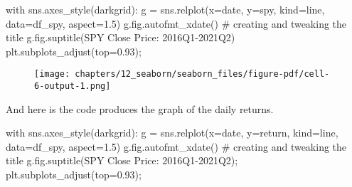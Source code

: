 \documentclass[
  letterpaper,
  DIV=11,
  numbers=noendperiod]{scrreprt}
\newenvironment{Shaded}{\begin{snugshade}}{\end{snugshade}}
\newcommand{\CommentTok}[1]{\textcolor[rgb]{0.37,0.37,0.37}{#1}}
\newcommand{\ControlFlowTok}[1]{\textcolor[rgb]{0.00,0.23,0.31}{#1}}
\newcommand{\FloatTok}[1]{\textcolor[rgb]{0.68,0.00,0.00}{#1}}
\newcommand{\NormalTok}[1]{\textcolor[rgb]{0.00,0.23,0.31}{#1}}
\newcommand{\OperatorTok}[1]{\textcolor[rgb]{0.37,0.37,0.37}{#1}}
\newcommand{\StringTok}[1]{\textcolor[rgb]{0.13,0.47,0.30}{#1}}
\begin{document}
\begin{Shaded}
\begin{Highlighting}[]
\ControlFlowTok{with}\NormalTok{ sns.axes\_style(}\StringTok{\textquotesingle{}darkgrid\textquotesingle{}}\NormalTok{):}
\NormalTok{    g }\OperatorTok{=}\NormalTok{ sns.relplot(x}\OperatorTok{=}\StringTok{\textquotesingle{}date\textquotesingle{}}\NormalTok{, y}\OperatorTok{=}\StringTok{\textquotesingle{}spy\textquotesingle{}}\NormalTok{, kind}\OperatorTok{=}\StringTok{\textquotesingle{}line\textquotesingle{}}\NormalTok{, data}\OperatorTok{=}\NormalTok{df\_spy, aspect}\OperatorTok{=}\FloatTok{1.5}\NormalTok{)}
\NormalTok{    g.fig.autofmt\_xdate()}
    \CommentTok{\# creating and tweaking the title}
\NormalTok{    g.fig.suptitle(}\StringTok{\textquotesingle{}SPY Close Price: 2016Q1{-}2021Q2\textquotesingle{}}\NormalTok{)}
\NormalTok{    plt.subplots\_adjust(top}\OperatorTok{=}\FloatTok{0.93}\NormalTok{)}\OperatorTok{;}
\end{Highlighting}
\end{Shaded}

\begin{figure}[H]

{\centering \texttt{[image: chapters/12\_seaborn/seaborn\_files/figure-pdf/cell-6-output-1.png]}

}

\end{figure}

And here is the code produces the graph of the daily returns.

\begin{Shaded}
\begin{Highlighting}[]
\ControlFlowTok{with}\NormalTok{ sns.axes\_style(}\StringTok{\textquotesingle{}darkgrid\textquotesingle{}}\NormalTok{):}
\NormalTok{    g }\OperatorTok{=}\NormalTok{ sns.relplot(x}\OperatorTok{=}\StringTok{\textquotesingle{}date\textquotesingle{}}\NormalTok{, y}\OperatorTok{=}\StringTok{\textquotesingle{}return\textquotesingle{}}\NormalTok{, kind}\OperatorTok{=}\StringTok{\textquotesingle{}line\textquotesingle{}}\NormalTok{, data}\OperatorTok{=}\NormalTok{df\_spy, aspect}\OperatorTok{=}\FloatTok{1.5}\NormalTok{)}
\NormalTok{    g.fig.autofmt\_xdate()}
    \CommentTok{\# creating and tweaking the title}
\NormalTok{    g.fig.suptitle(}\StringTok{\textquotesingle{}SPY Close Price: 2016Q1{-}2021Q2\textquotesingle{}}\NormalTok{)}\OperatorTok{;}
\NormalTok{    plt.subplots\_adjust(top}\OperatorTok{=}\FloatTok{0.93}\NormalTok{)}\OperatorTok{;}
\end{Highlighting}
\end{Shaded}
\end{document}
